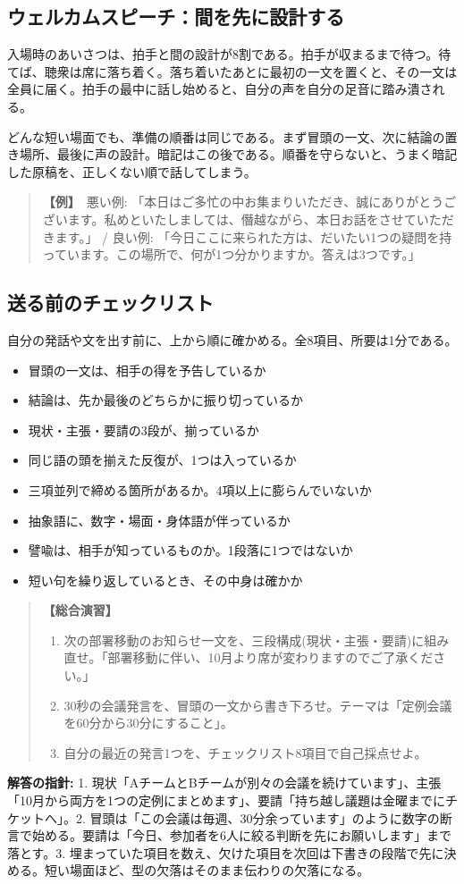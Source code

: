 \documentclass{article}
\begin{document}
\subsection{ウェルカムスピーチ：間を先に設計する}

入場時のあいさつは、拍手と間の設計が8割である。拍手が収まるまで待つ。待てば、聴衆は席に落ち着く。落ち着いたあとに最初の一文を置くと、その一文は全員に届く。拍手の最中に話し始めると、自分の声を自分の足音に踏み潰される。

どんな短い場面でも、準備の順番は同じである。まず冒頭の一文、次に結論の置き場所、最後に声の設計。暗記はこの後である。順番を守らないと、うまく暗記した原稿を、正しくない順で話してしまう。

\begin{quote}
\textbf{【例】}\ 悪い例: 「本日はご多忙の中お集まりいただき、誠にありがとうございます。私めといたしましては、僭越ながら、本日お話をさせていただきます。」 / 良い例: 「今日ここに来られた方は、だいたい1つの疑問を持っています。この場所で、何が1つ分かりますか。答えは3つです。」
\end{quote}

\subsection{送る前のチェックリスト}

自分の発話や文を出す前に、上から順に確かめる。全8項目、所要は1分である。

\begin{itemize}
\item 冒頭の一文は、相手の得を予告しているか
\item 結論は、先か最後のどちらかに振り切っているか
\item 現状・主張・要請の3段が、揃っているか
\item 同じ語の頭を揃えた反復が、1つは入っているか
\item 三項並列で締める箇所があるか。4項以上に膨らんでいないか
\item 抽象語に、数字・場面・身体語が伴っているか
\item 譬喩は、相手が知っているものか。1段落に1つではないか
\item 短い句を繰り返しているとき、その中身は確かか
\end{itemize}

\begin{quote}
\textbf{【総合演習】}
\begin{enumerate}
\item 次の部署移動のお知らせ一文を、三段構成(現状・主張・要請)に組み直せ。「部署移動に伴い、10月より席が変わりますのでご了承ください。」
\item 30秒の会議発言を、冒頭の一文から書き下ろせ。テーマは「定例会議を60分から30分にすること」。
\item 自分の最近の発言1つを、チェックリスト8項目で自己採点せよ。
\end{enumerate}
\end{quote}

\textbf{解答の指針:} 1. 現状「AチームとBチームが別々の会議を続けています」、主張「10月から両方を1つの定例にまとめます」、要請「持ち越し議題は金曜までにチケットへ」。2. 冒頭は「この会議は毎週、30分余っています」のように数字の断言で始める。要請は「今日、参加者を6人に絞る判断を先にお願いします」まで落とす。3. 埋まっていた項目を数え、欠けた項目を次回は下書きの段階で先に決める。短い場面ほど、型の欠落はそのまま伝わりの欠落になる。
\end{document}
